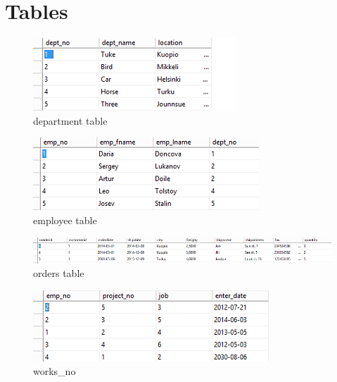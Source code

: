 \documentclass[english]{article}
\begin{document}
\section{Tables}
\begin{figure}[H]
\centerline{\includegraphics[scale=0.8]{FunctionsSQLServer/department}}
\caption{department table}
\end{figure}
\begin{figure}[H]
\centerline{\includegraphics[scale=0.8]{FunctionsSQLServer/employee}}
\caption{employee table}
\end{figure}
\begin{figure}[H]
\centerline{\includegraphics[scale=0.8]{FunctionsSQLServer/orders}}
\caption{orders table}
\end{figure}
\begin{figure}[H]
\centerline{\includegraphics[scale=0.8]{FunctionsSQLServer/works_no}}
\caption{works\_no}
\end{figure}
\end{document}
